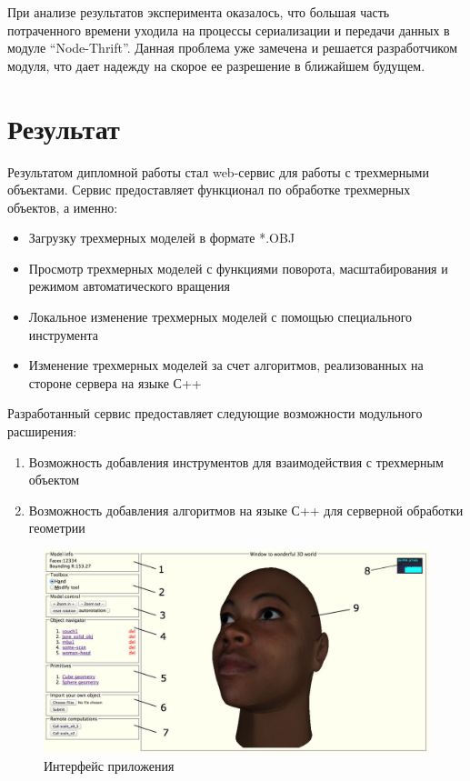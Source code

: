 \documentclass[14pt, a4paper]{extarticle}
\let\stdsection\section
\renewcommand\section{\newpage\stdsection}
\begin{document}
При анализе результатов эксперимента оказалось, что большая часть потраченного
времени уходила на процессы сериализации и передачи данных в модуле
``Node-Thrift''. Данная проблема уже замечена и решается разработчиком модуля,
что дает надежду на скорое ее разрешение в ближайшем будущем.

\section{Результат}

Результатом дипломной работы стал web-сервис для работы с трехмерными объектами.
Сервис предоставляет функционал по обработке трехмерных объектов, а именно:
\begin{itemize}
    \item Загрузку трехмерных моделей в формате *.OBJ
    \item Просмотр трехмерных моделей с функциями поворота, масштабирования
    и режимом автоматического вращения
    \item Локальное изменение трехмерных моделей с помощью специального инструмента
    \item Изменение трехмерных моделей за счет алгоритмов,
    реализованных на стороне сервера на языке С++
\end{itemize}

Разработанный сервис предоставляет следующие возможности модульного
расширения:
\begin{enumerate}
    \item Возможность добавления инструментов для взаимодействия с
    трехмерным объектом
    \item Возможность добавления алгоритмов на языке С++ для серверной обработки
    геометрии
\end{enumerate}

\begin{figure}[htb]
\centering
\includegraphics[width=1.0\textwidth]{ui.jpg}
\caption{Интерфейс приложения}
\label{fig:ui}
\end{figure}
\end{document}
